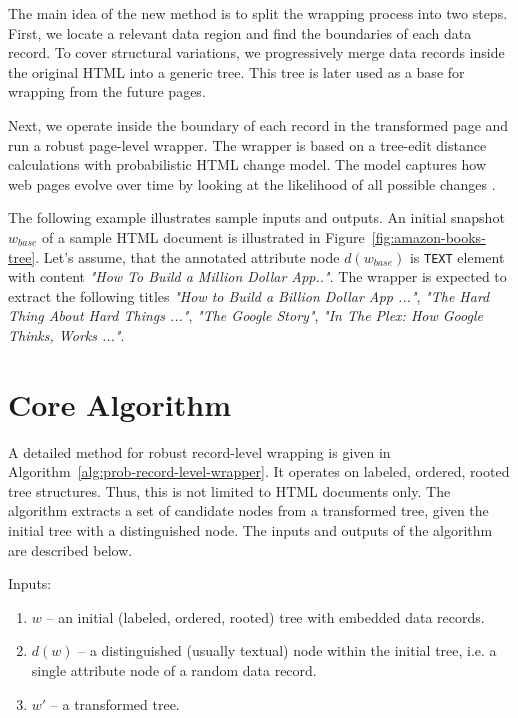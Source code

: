 The main idea of the new method is to split the wrapping process into two steps. First, we locate a relevant data region and find the boundaries of each data record. To cover structural variations, we progressively merge data records inside the original HTML into a generic tree. This tree is later used as a base for wrapping from the future pages. 

Next, we operate inside the boundary of each record in the transformed page and run a robust page-level wrapper. The wrapper is based on a tree-edit distance calculations with probabilistic HTML change model. The model captures how web pages evolve over time by looking at the likelihood of all possible changes \cite{dalvi2009a}.

The following example illustrates sample inputs and outputs. An initial snapshot $w_{base}$ of a sample HTML document is illustrated in Figure~\ref{fig:amazon-books-tree}. Let's assume, that the annotated attribute node $d(w_{base})$ is \texttt{TEXT} element with content \emph{"How To Build a Million Dollar App.."}. The wrapper is expected to extract the following titles \emph{"How to Build a Billion Dollar App ..."}, \emph{"The Hard Thing About Hard Things ..."}, \emph{"The Google Story"}, \emph{"In The Plex: How Google Thinks, Works ..."}.


\section{Core Algorithm}

A detailed method for robust record-level wrapping is given in Algorithm~\ref{alg:prob-record-level-wrapper}. It operates on labeled, ordered, rooted tree structures. Thus, this is not limited to HTML documents only. The algorithm extracts a set of candidate nodes from a transformed tree, given the initial tree with a distinguished node. The inputs and outputs of the algorithm are described below.

Inputs: 

\begin{enumerate}
	\item $w$ -- an initial (labeled, ordered, rooted) tree with embedded data records.
	\item $d(w)$ -- a distinguished (usually textual) node within the initial tree, i.e. a single attribute node of a random data record.
	\item $w'$ -- a transformed tree.
\end{enumerate}


